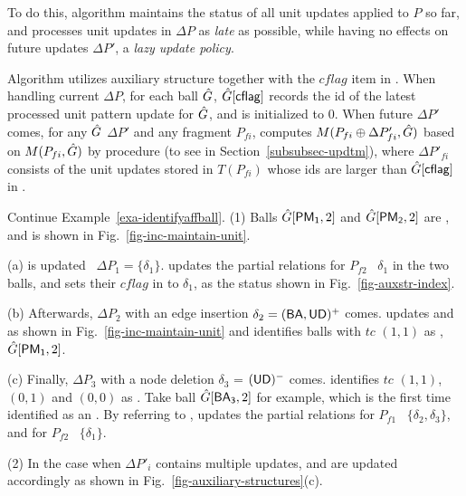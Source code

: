 To do this, algorithm \incp maintains the status of all unit updates applied to $P$ so far, and processes unit updates in $\Delta P$ as {\em late} as possible, while having no effects on future updates $\Delta P'$, \ie a {\em lazy update policy}.

Algorithm \incp utilizes auxiliary structure \upl together with the $cflag$ item in \bs.
When handling current $\Delta P$, for each ball $\hat{G}{}$, $\hat{G}{}[{\mathsf{cflag}}]$ records the id of the latest processed unit pattern update for $\hat{G}{}$, and is initialized to $0$.
When future $\Delta P'$ comes, for any \affballx $\hat{G}{}$ \wrt $\Delta P'$ and any fragment $P_{fi}$,
\incp computes $M(P_{fi}\oplus\Delta P'_{fi}, \hat{G}{})$ based on $M(P_{fi}, \hat{G}{})$ by procedure \incmatch (to see in Section~\ref{subsubsec-updtm}),
where $\Delta P'_{fi}$ consists of the unit updates stored in $T(P_{fi})$ whose ids are larger than $\hat{G}{}[{\mathsf{cflag}}]$ in \bs.




\begin{example}
\label{exa-lazyupdate}
Continue Example~\ref{exa-identifyaffball}.
(1) Balls $\hat{G}{[{\mathsf{PM_1}},2]}$ and $\hat{G}{[{\mathsf{PM_2}},2]}$ are \affballsx, and
\upl is shown in Fig.~\ref{fig-inc-maintain-unit}.

\sstab(a) \upl is updated \wrt\ $\Delta P_1=\{\delta_1\}$.
\incp updates the partial relations for $P_{f2}$ \wrt\ $\delta_1$ in the two balls,
and sets their $cflag$ in \bs to $\delta_1$, as the status shown in Fig.~\ref{fig-auxstr-index}.

\sstab
(b) Afterwards, $\Delta P_2$ with an edge insertion $\delta_2 = ({\mathsf{BA}},{\mathsf{UD}})^+$ comes.
\identifyaffball updates \bfc and \upl as shown in Fig.~\ref{fig-inc-maintain-unit} and identifies balls with $tc$ $(1, 1)$ as \affballsx, \eg $\hat{G}{[{\mathsf{PM_1}},2]}$.

\sstab
(c) Finally, $\Delta P_3$ with a node deletion $\delta_3$ = $({\mathsf{UD}})^-$ comes.
\identifyaffball identifies $tc$ $(1, 1)$, $(0, 1)$ and $(0, 0)$ as \affballsx.
Take ball $\hat{G}{[{\mathsf{BA_3}}, 2]}$ for example, which is the first time identified as an \affballx.
By referring to \upl, \incp updates the partial relations for $P_{f1}$ \wrt\ $\{\delta_2, \delta_3\}$,
and for $P_{f2}$ \wrt\ $\{\delta_1\}$.


\sstab
(2) In the case when $\Delta P'_i$ contains multiple updates, \bfc and \upl are updated accordingly as shown in Fig.~\ref{fig-auxiliary-structures}(c).
\end{example}

